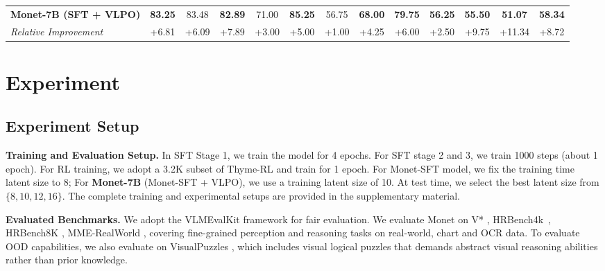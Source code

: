 \begin{table}[t]
{\begin{tabular}{lcccccccccccc}
        \\
        \textbf{Monet-7B (SFT + VLPO)} & \textbf{83.25} & 83.48 & \textbf{82.89} & 71.00 & \textbf{85.25} & 56.75 & \textbf{68.00} & \textbf{79.75} & \textbf{56.25} & \textbf{55.50} & \textbf{51.07} & \textbf{58.34} \\
        \textit{Relative Improvement} & \textcolor[rgb]{0,0.6,0}{+6.81} & \textcolor[rgb]{0,0.6,0}{+6.09} & \textcolor[rgb]{0,0.6,0}{+7.89} & \textcolor[rgb]{0,0.6,0}{+3.00} & \textcolor[rgb]{0,0.6,0}{+5.00} & \textcolor[rgb]{0,0.6,0}{+1.00} & \textcolor[rgb]{0,0.6,0}{+4.25} & \textcolor[rgb]{0,0.6,0}{+6.00} & \textcolor[rgb]{0,0.6,0}{+2.50} & \textcolor[rgb]{0,0.6,0}{+9.75} & \textcolor[rgb]{0,0.6,0}{+11.34} & \textcolor[rgb]{0,0.6,0}{+8.72} \\
        \bottomrule
    \end{tabular}%
    }
\end{table}


\section{Experiment}
\label{sec:experiment}

\subsection{Experiment Setup}
\textbf{Training and Evaluation Setup.} In SFT Stage 1, we train the model for 4 epochs. For SFT stage 2 and 3, we train 1000 steps (about 1 epoch). For RL training, we adopt a 3.2K subset of Thyme-RL \citep{zhang2025thyme} and train for 1 epoch. For Monet-SFT model, we fix the training time latent size to 8; For \textbf{Monet-7B} (Monet-SFT + VLPO), we use a training latent size of 10. At test time, we select the best latent size from $\{8, 10, 12, 16\}$. The complete training and experimental setups are provided in the supplementary material.%


\textbf{Evaluated Benchmarks.} We adopt the VLMEvalKit \citep{duan2024vlmevalkit} framework for fair evaluation. We evaluate Monet on V* \citep{wu2024v}, HRBench4k~\citep{wang2025divide}, HRBench8K \citep{wang2025divide}, MME-RealWorld \citep{zhang2024mme}, covering fine-grained perception and reasoning tasks on real-world, chart and OCR data. To evaluate OOD capabilities, we also evaluate on VisualPuzzles \citep{song2025visualpuzzles}, which includes visual logical puzzles that demands abstract visual reasoning abilities rather than prior knowledge.

